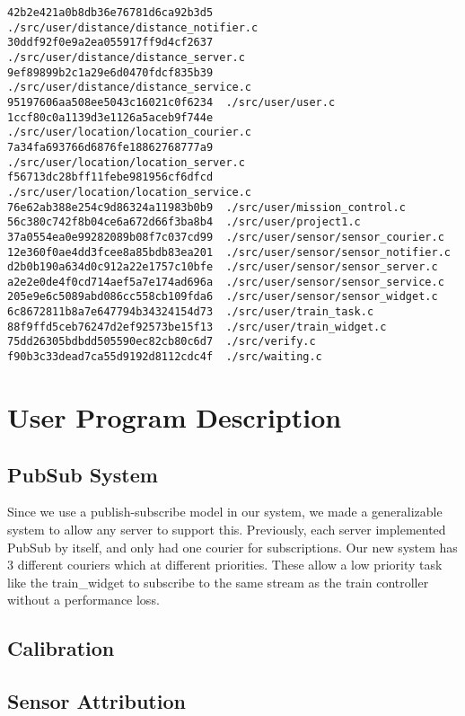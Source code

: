 \documentclass{article}
\begin{document}
\begin{verbatim}
42b2e421a0b8db36e76781d6ca92b3d5  ./src/user/distance/distance_notifier.c
30ddf92f0e9a2ea055917ff9d4cf2637  ./src/user/distance/distance_server.c
9ef89899b2c1a29e6d0470fdcf835b39  ./src/user/distance/distance_service.c
95197606aa508ee5043c16021c0f6234  ./src/user/user.c
1ccf80c0a1139d3e1126a5aceb9f744e  ./src/user/location/location_courier.c
7a34fa693766d6876fe18862768777a9  ./src/user/location/location_server.c
f56713dc28bff11febe981956cf6dfcd  ./src/user/location/location_service.c
76e62ab388e254c9d86324a11983b0b9  ./src/user/mission_control.c
56c380c742f8b04ce6a672d66f3ba8b4  ./src/user/project1.c
37a0554ea0e99282089b08f7c037cd99  ./src/user/sensor/sensor_courier.c
12e360f0ae4dd3fcee8a85bdb83ea201  ./src/user/sensor/sensor_notifier.c
d2b0b190a634d0c912a22e1757c10bfe  ./src/user/sensor/sensor_server.c
a2e2e0de4f0cd714aef5a7e174ad696a  ./src/user/sensor/sensor_service.c
205e9e6c5089abd086cc558cb109fda6  ./src/user/sensor/sensor_widget.c
6c8672811b8a7e647794b34324154d73  ./src/user/train_task.c
88f9ffd5ceb76247d2ef92573be15f13  ./src/user/train_widget.c
75dd26305bdbdd505590ec82cb80c6d7  ./src/verify.c
f90b3c33dead7ca55d9192d8112cdc4f  ./src/waiting.c
\end{verbatim}

\section{User Program Description}

\subsection{PubSub System}

Since we use a publish-subscribe model in our system, we made a generalizable system to allow any server to support this. Previously, each server implemented PubSub by itself, and only had one courier for subscriptions. Our new system has 3 different couriers which at different priorities. These allow a low priority task like the train_widget to subscribe to the same stream as the train controller without a performance loss.

\subsection{Calibration}

\subsection{Sensor Attribution}
\end{document}
